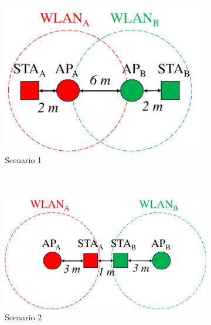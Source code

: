 \documentclass[preprint,12pt]{elsarticle}
\begin{document}
\begin{figure}[t!]
	\centering		
	\begin{minipage}[b]{0.35\textwidth}		
		\begin{subfigure}[b]{0.8\linewidth}
			\includegraphics[width=\textwidth]{s1_interactions}
			\caption{Scenario 1}\label{fig:s1_interactions}
		\end{subfigure}\\[\baselineskip]
		\begin{subfigure}[b]{\linewidth}
			\includegraphics[width=\textwidth]{s2_interactions}
			\caption{Scenario 2}\label{fig:s2_interactions}
		\end{subfigure}
	\end{minipage}
	\begin{minipage}[b]{0.3\textwidth}		
		\begin{subfigure}[b]{\linewidth}

\end{subfigure}
\end{minipage}
\end{figure}
\end{document}
